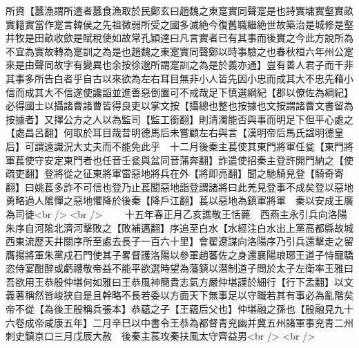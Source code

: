 所資【蠶漁謂所遣者蠶食漁取於民鄭玄曰趙魏之東寔實同聲寔是也詩實墉實壑實畝實籍實當作寔言韓侯之先祖微弱所受之國多滅絶今復舊職繼絶世故築治是城修是壑井牧是田畝收歛是賦稅使如故常孔穎達曰凡言實者已有其事而後實之今此方說所為不宜為實故轉為寔訓之為是也趙魏之東寔實同聲鄭以時事驗之也春秋桓六年州公寔來是由聲同故字有變異也余按徐邈所謂寔訓之為是於義亦通】豈有善人君子而干非其事多所告白者乎自古以來欲為左右耳目無非小人皆先因小忠而成其大不忠先藉小信而成其大不信遂使讒謟並進善惡倒置可不戒哉足下慎選綱紀【郡以僚佐為綱紀】必得國士以攝諸曹諸曹皆得良吏以掌文按【攝總也整也按據也文按謂諸曹文書留為按據者】又擇公方之人以為監司【監工銜翻】則清濁能否與事而明足下但平心處之【處昌呂翻】何取於耳目哉昔明德馬后未嘗顧左右與言【漢明帝后馬氏諡明德皇后】可謂遠識況大丈夫而不能免此乎　十二月後秦主萇使其東門將軍任瓫【東門將軍萇使守安定東門者也任音壬瓫與盆同音蒲奔翻】詐遣使招秦主登許開門納之【使疏吏翻】登將從之征東將軍雷惡地將兵在外【將即亮翻】聞之馳騎見登【騎奇寄翻】曰姚萇多詐不可信也登乃止萇聞惡地詣登謂諸將曰此羌見登事不成矣登以惡地勇略過人隂憚之惡地懼降於後秦【降戶江翻】萇以惡地為鎮軍將軍　秦以安成王廣為司徒<br />
<br />
　　十五年春正月乙亥譙敬王恬薨　西燕主永引兵向洛陽朱序自河隂北濟河擊敗之【敗補邁翻】序追至白水【水經注白水出上黨高都縣故城西東流歷天井關序所至處去長子一百六十里】會翟遼謀向洛陽序乃引兵還擊走之留膺揚將軍朱黨戍石門使其子畧督護洛陽以參軍趙蕃佐之身還襄陽琅琊王道子恃寵驕恣侍宴酣醉或虧禮敬帝益不能平欲選時望為藩鎮以潜制道子問於太子左衛率王雅曰吾欲用王恭殷仲堪何如雅曰王恭風神簡貴志氣方嚴仲堪謹於細行【行下孟翻】以文義著稱然皆峻狭自是且幹略不長若委以方面天下無事足以守職若其有事必為亂階矣帝不從【為後王殷稱兵張本】恭藴之子【王藴后父也】仲堪融之孫也【殷融見九十六卷成帝咸康五年】二月辛巳以中書令王恭為都督青兖幽并冀五州諸軍事兖青二州刺史鎮京口三月戊辰大赦　後秦主萇攻秦扶風太守齊益男<br />
<br />
